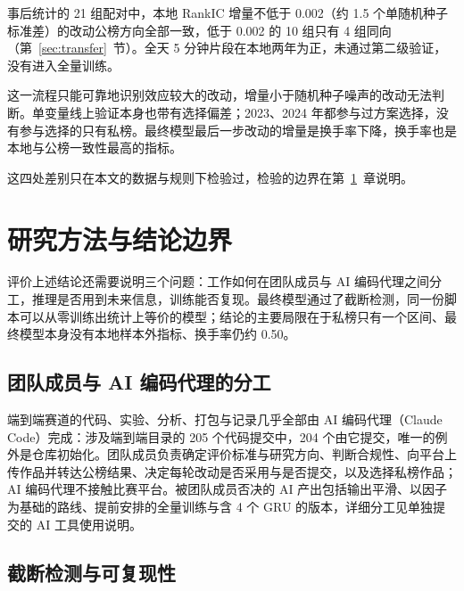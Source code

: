 \documentclass[UTF8,a4paper,zihao=-4,fontset=none]{ctexart}
\begin{document}
事后统计的 21 组配对中，本地 RankIC 增量不低于 0.002（约 1.5 个单随机种子标准差）的改动公榜方向全部一致，低于 0.002 的 10 组只有 4 组同向（第~\ref{sec:transfer}~节）。全天 5 分钟片段在本地两年为正，未通过第二级验证，没有进入全量训练。

这一流程只能可靠地识别效应较大的改动，增量小于随机种子噪声的改动无法判断。单变量线上验证本身也带有选择偏差；2023、2024 年都参与过方案选择，没有参与选择的只有私榜。最终模型最后一步改动的增量是换手率下降，换手率也是本地与公榜一致性最高的指标。

这四处差别只在本文的数据与规则下检验过，检验的边界在第~\ref{sec:limit-ch}~章说明。

\section{研究方法与结论边界}\label{sec:limit-ch}

评价上述结论还需要说明三个问题：工作如何在团队成员与 AI 编码代理之间分工，推理是否用到未来信息，训练能否复现。最终模型通过了截断检测，同一份脚本可以从零训练出统计上等价的模型；结论的主要局限在于私榜只有一个区间、最终模型本身没有本地样本外指标、换手率仍约 0.50。

\subsection{团队成员与 AI 编码代理的分工}

端到端赛道的代码、实验、分析、打包与记录几乎全部由 AI 编码代理（Claude Code）完成：涉及端到端目录的 205 个代码提交中，204 个由它提交，唯一的例外是仓库初始化。团队成员负责确定评价标准与研究方向、判断合规性、向平台上传作品并转达公榜结果、决定每轮改动是否采用与是否提交，以及选择私榜作品；AI 编码代理不接触比赛平台。被团队成员否决的 AI 产出包括输出平滑、以因子为基础的路线、提前安排的全量训练与含 4 个 GRU 的版本，详细分工见单独提交的 AI 工具使用说明。

\subsection{截断检测与可复现性}
\end{document}
